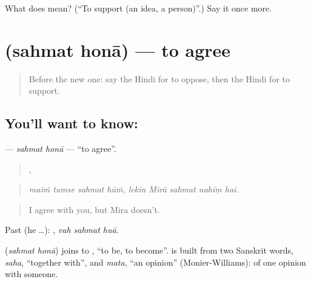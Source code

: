 \begin{tcolorbox}[breakable,colback=teal!4,colframe=teal!35!black,title={Before you move on}]
What does   mean? (\textquotedblleft{}To support (an idea, a person)\textquotedblright{}.) Say it once more.
\end{tcolorbox}
\section[\texorpdfstring{\hi{सहमत} \hi{होना} (sahmat honā)}{सहमत होना (sahmat honā)}]{  (sahmat honā) — to agree}

\label{lesson:HI-C347-sahmathona}



\begin{quote}
Before the new one: say the Hindi for to oppose, then the Hindi for to support.
\end{quote}

\subsection*{You'll want to know:  }
\textbf{ } — \emph{sahmat honā} — \textquotedblleft{}to agree\textquotedblright{}.

\begin{quote}
   ,     
\end{quote}

\begin{quote}
\emph{maiṁ tumse sahmat hūṁ, lekin Mīrā sahmat nahīṃ hai.}
\end{quote}

\begin{quote}
I agree with you, but Mira doesn't.
\end{quote}

Past (he …):   , \emph{vah sahmat huā}.

\begin{cousinweb}
\textbf{ } (\emph{sahmat honā}) joins  to , \textquotedblleft{}to be, to become\textquotedblright{}.  is built from two Sanskrit words, \emph{saha}, \textquotedblleft{}together with\textquotedblright{}, and \emph{mata}, \textquotedblleft{}an opinion\textquotedblright{} (Monier-Williams): of one opinion with someone.
\end{cousinweb}

